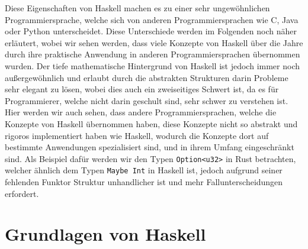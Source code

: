 \documentclass{hhuarticle}
\theoremstyle{definition}
\theoremstyle{theorem}
\begin{document}
  Diese Eigenschaften von Haskell machen es zu einer sehr ungewöhnlichen
  Programmiersprache, welche sich von anderen Programmiersprachen
  wie C, Java oder Python unterscheidet. Diese Unterschiede werden
  im Folgenden noch näher erläutert, wobei wir sehen werden,
  dass viele Konzepte von Haskell über die Jahre durch ihre praktische
  Anwendung in anderen Programmiersprachen übernommen wurden.
  Der tiefe mathematische Hintergrund von Haskell ist jedoch
  immer noch außergewöhnlich und erlaubt durch die abstrakten
  Strukturen darin Probleme sehr elegant zu lösen, wobei dies auch
  ein zweiseitiges Schwert ist, da es für Programmierer, welche
  nicht darin geschult sind, sehr schwer zu verstehen ist. Hier werden
  wir auch sehen, dass andere Programmiersprachen, welche die
  Konzepte von Haskell übernommen haben, diese Konzepte nicht
  so abstrakt und rigoros implementiert haben wie Haskell, wodurch
  die Konzepte dort auf bestimmte Anwendungen spezialisiert sind,
  und in ihrem Umfang eingeschränkt sind.
  Als Beispiel dafür werden wir den Typen \verb|Option<u32>| in
  Rust betrachten, welcher ähnlich dem Typen \verb|Maybe Int| in Haskell
  ist, jedoch aufgrund seiner fehlenden Funktor Struktur unhandlicher
  ist und mehr Fallunterscheidungen erfordert.






  \section{Grundlagen von Haskell}
  
\end{document}
